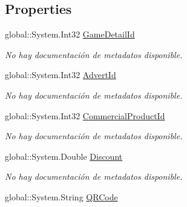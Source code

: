 \subsection*{Properties}
\begin{DoxyCompactItemize}
\item 
global\-::\-System.\-Int32 \hyperlink{class_microsoft_1_1_samples_1_1_kinect_1_1_basic_interactions_1_1_game_details_a9d378af32d3ad8dc80b8e404c0aa54b9}{Game\-Detail\-Id}
\begin{DoxyCompactList}\small\item\em No hay documentación de metadatos disponible. \end{DoxyCompactList}\item 
global\-::\-System.\-Int32 \hyperlink{class_microsoft_1_1_samples_1_1_kinect_1_1_basic_interactions_1_1_game_details_abb42070f7298c6c4e6666e949e5e7a01}{Advert\-Id}
\begin{DoxyCompactList}\small\item\em No hay documentación de metadatos disponible. \end{DoxyCompactList}\item 
global\-::\-System.\-Int32 \hyperlink{class_microsoft_1_1_samples_1_1_kinect_1_1_basic_interactions_1_1_game_details_a171f90076ba287fd3adf48b4460e1dce}{Commercial\-Product\-Id}
\begin{DoxyCompactList}\small\item\em No hay documentación de metadatos disponible. \end{DoxyCompactList}\item 
global\-::\-System.\-Double \hyperlink{class_microsoft_1_1_samples_1_1_kinect_1_1_basic_interactions_1_1_game_details_a097d3609254c0b28d92ebf8178216cec}{Discount}
\begin{DoxyCompactList}\small\item\em No hay documentación de metadatos disponible. \end{DoxyCompactList}\item 
global\-::\-System.\-String \hyperlink{class_microsoft_1_1_samples_1_1_kinect_1_1_basic_interactions_1_1_game_details_af8d26ff07f2f2a17c2fde020f803489f}{Q\-R\-Code}

\end{DoxyCompactItemize}
